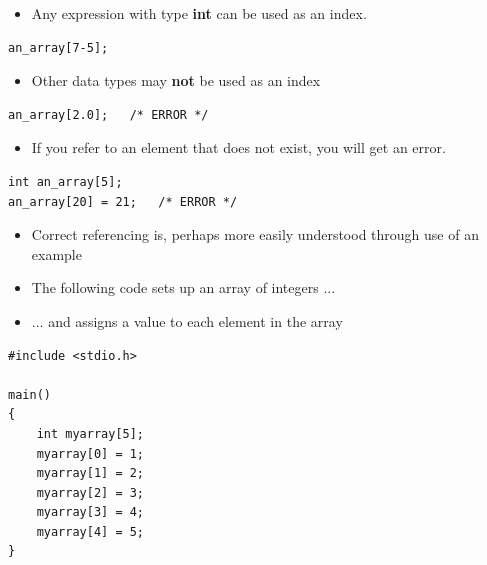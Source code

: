 \documentclass{beamer}
\begin{document}
\begin{frame}[fragile]
\begin{itemize}
\item Any expression with type \textbf{int} can be used as an index.
\end{itemize}

\begin{block}{}
\begin{lstlisting}
an_array[7-5];
\end{lstlisting}
\end{block}

\begin{itemize}
\item Other data types may \textbf{not} be used as an index
\end{itemize}

\begin{block}{}
\begin{lstlisting}
an_array[2.0];   /* ERROR */
\end{lstlisting}
\end{block}

\begin{itemize}
\item If you refer to an element that does not exist, you will get an error.
\end{itemize}

\begin{block}{}
\begin{lstlisting}
int an_array[5];
an_array[20] = 21;   /* ERROR */
\end{lstlisting}
\end{block}
\end{frame}

\begin{frame}
\begin{itemize}
\item Correct referencing is, perhaps more easily understood through use of an example
\end{itemize}
\begin{itemize}
\item The following code sets up an array of integers ...
\item ... and assigns a value to each element in the array
\end{itemize}
 \end{frame}

\begin{frame}[fragile]
\begin{block}{}
\begin{lstlisting}
#include <stdio.h>

main() 
{
    int myarray[5];
    myarray[0] = 1;
    myarray[1] = 2;
    myarray[2] = 3;
    myarray[3] = 4;
    myarray[4] = 5;
}
\end{lstlisting}
\end{block}
\end{frame}
\end{document}
